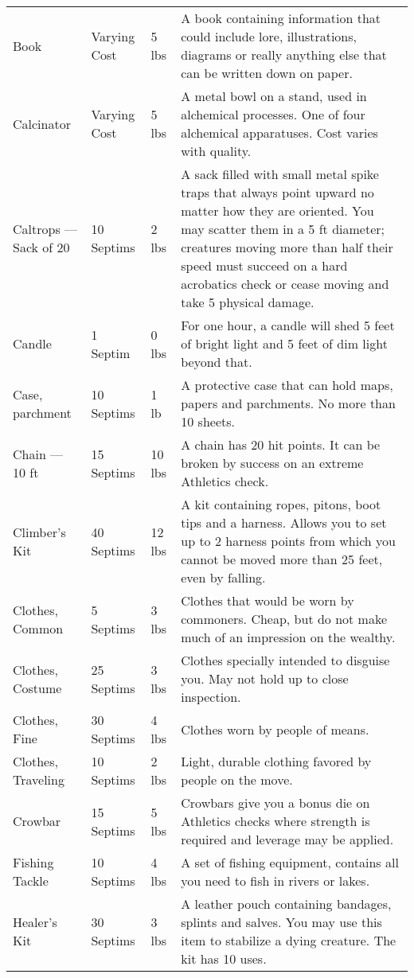 {\begin{longtable}{p{}llp{}}
	Book & Varying Cost & 5 lbs & A book containing information that could include lore, illustrations, diagrams or really anything else that can be written down on paper.\\
	Calcinator & Varying Cost & 5 lbs & A metal bowl on a stand, used in alchemical processes. One of four alchemical apparatuses. Cost varies with quality.\\
	Caltrops --- Sack of 20 & 10 Septims & 2 lbs & A sack filled with small metal spike traps that always point upward no matter how they are oriented. You may scatter them in a 5 ft diameter; creatures moving more than half their speed must succeed on a hard acrobatics check or cease moving and take 5 physical damage.\\
	Candle & 1 Septim & 0 lbs & For one hour, a candle will shed 5 feet of bright light and 5 feet of dim light beyond that.\\
	Case, parchment & 10 Septims & 1 lb & A protective case that can hold maps, papers and parchments. No more than 10 sheets.\\
	Chain --- 10 ft & 15 Septims & 10 lbs & A chain has 20 hit points. It can be broken by success on an extreme Athletics check.\\
	Climber's Kit & 40 Septims & 12 lbs & A kit containing ropes, pitons, boot tips and a harness. Allows you to set up to 2 harness points from which you cannot be moved more than 25 feet, even by falling.\\
	Clothes, Common & 5 Septims & 3 lbs & Clothes that would be worn by commoners. Cheap, but do not make much of an impression on the wealthy.\\
	Clothes, Costume & 25 Septims & 3 lbs & Clothes specially intended to disguise you. May not hold up to close inspection.\\
	Clothes, Fine & 30 Septims & 4 lbs & Clothes worn by people of means.\\
	Clothes, Traveling & 10 Septims & 2 lbs & Light, durable clothing favored by people on the move.\\
	Crowbar & 15 Septims & 5 lbs & Crowbars give you a bonus die on Athletics checks where strength is required and leverage may be applied.\\
	Fishing Tackle & 10 Septims & 4 lbs & A set of fishing equipment, contains all you need to fish in rivers or lakes.\\
	Healer's Kit & 30 Septims & 3 lbs & A leather pouch containing bandages, splints and salves. You may use this item to stabilize a dying creature. The kit has 10 uses.\\

\end{longtable}}
